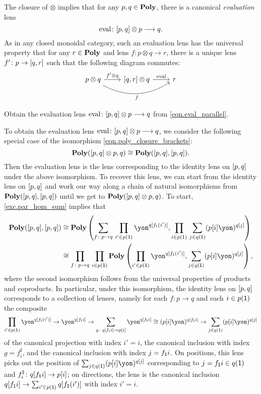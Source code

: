 \documentclass[Book-Poly]{subfiles}
\begin{document}
The closure of $\otimes$ implies that for any $p,q\in\mathbf{Poly}$, there is a canonical \emph{evaluation} lens
\begin{equation}\label{eqn.eval_parallel}
  \mathrm{eval}\colon [p,q]\otimes p\longrightarrow q.
\end{equation}
As in any closed monoidal category, such an evaluation lens has the universal property that for any $r\in\mathbf{Poly}$ and lens $f\colon p\otimes q\to r$, there is a unique lens $f'\colon p\to[q,r]$ such that the following diagram commutes:
\[
    \begin{tikzcd}
    	p\otimes q\ar[r, "f'\otimes q"]\ar[rr, bend right, "f"']&
    	{\ihom{q,r}}\otimes q\ar[r, "\fun{eval}"]&
    	r
    \end{tikzcd}
\]

\begin{exercise} \label{exc.eval_parallel}
Obtain the evaluation lens $\mathrm{eval}\colon [p,q]\otimes p\longrightarrow q$ from \eqref{eqn.eval_parallel}.
\begin{solution}
To obtain the evaluation lens $\mathrm{eval}\colon [p,q]\otimes p\longrightarrow q$, we consider the following special case of the isomorphism \eqref{eqn.poly_closure_brackets}:
\[
    \mathbf{Poly}([p,q] \otimes p, q) \cong \mathbf{Poly}([p,q], [p,q]).
\]
Then the evaluation lens is the lens corresponding to the identity lens on $[p,q]$ under the above isomorphism.
To recover this lens, we can start from the identity lens on $[p,q]$ and work our way along a chain of natural isomorphisms from $\mathbf{Poly}([p,q], [p,q])$ until we get to $\mathbf{Poly}([p,q] \otimes p, q)$.
To start, \cref{exc.par_hom_sum} implies that
\begin{align*}\index{isomorphism!natural}
    \poly(\ihom{p,q}, \ihom{p,q})
    &\iso
    \poly\left(\sum_{f \colon p \to q} \, \prod_{i' \in p(\1)} \yon^{q[f_\1(i')]}, \prod_{i \in p(\1)} \, \sum_{j \in q(\1)} (p[i]\yon)^{q[j]}\right) \\
    &\iso
    \prod_{f \colon p \to q} \, \prod_{i \in p(\1)} \poly\left(\prod_{i' \in p(\1)} \yon^{q[f_\1(i')]}, \sum_{j \in q(\1)} (p[i]\yon)^{q[j]}\right),
\end{align*}
where the second isomorphism follows from the universal properties of products and coproducts.
In particular, under this isomorphism, the identity lens on $[p,q]$ corresponds to a collection of lenses, namely for each $f \colon p \to q$ and each $i \in p(\textsf{1})$ the composite
\[
    \prod_{i' \in p(\1)} \yon^{q[f_\1(i')]} \to \yon^{q[f_\1i]} \to \sum_{g \colon q[f_\1i] \to p[i]} \yon^{q[f_\1i]} \iso (p[i]\yon)^{q[f_\1i]} \to \sum_{j \in q(\1)} (p[i]\yon)^{q[j]}
\]
of the canonical projection with index $i' = i$, the canonical inclusion with index $g = f^\sharp_i$, and the canonical inclusion with index $j = f_{\textsf{1}}i$.
On positions, this lens picks out the position of $\sum_{j \in q(\1)} (p[i]\yon)^{q[j]}$ corresponding to $j = f_{\textsf{1}}i \in q(\textsf{1})$ and $f^\sharp_i \colon q[f_{\textsf{1}}i] \to p[i]$; on directions, the lens is the canonical inclusion $q[f_{\textsf{1}}i] \to \sum_{i' \in p(\textsf{1})} q[f_{\textsf{1}}(i')]$ with index $i' = i$.


\end{solution}
\end{exercise}
\end{document}
